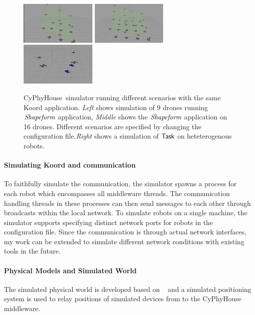 \begin{figure}[h]
    \includegraphics[width=0.33\textwidth]{figs/shapeform_9}
    \includegraphics[width=0.33\textwidth]{figs/shapeform_16}
    \includegraphics[width=0.33\textwidth]{figs/taskapp_2_2.png}
  \caption{\small CyPhyHouse\ simulator running different scenarios with the same Koord application. \emph{Left} shows simulation of 9 drones running $\textit{Shapeform}$ application, \emph{Middle} shows the $\textit{Shapeform}$ application on 16 drones. Different scenarios are specified by changing the configuration file.\emph{Right} shows a simulation of $\textsf{Task}$ on heteterogenous robots. \vspace{-5mm} }
  \label{fig:simexp}
\end{figure}

\paragraph*{Simulating Koord and communication}
To faithfully simulate the communication, the simulator spawns a process for each robot which encompasses all middleware threads.
The communication handling threads in these processes can then send messages to each other through broadcasts within the local network. To simulate robots on a single machine, the simulator supports specifying distinct network ports for robots in the configuration file. Since the communication is through actual network interfaces, my work can be extended to simulate different network conditions with existing tools in the future.

\paragraph*{Physical Models and Simulated World}
The simulated physical world is developed based on \Gazebo~\cite{gazebo}
and a simulated positioning system is used to relay positions of simulated devices from \Gazebo to the CyPhyHouse middleware.

